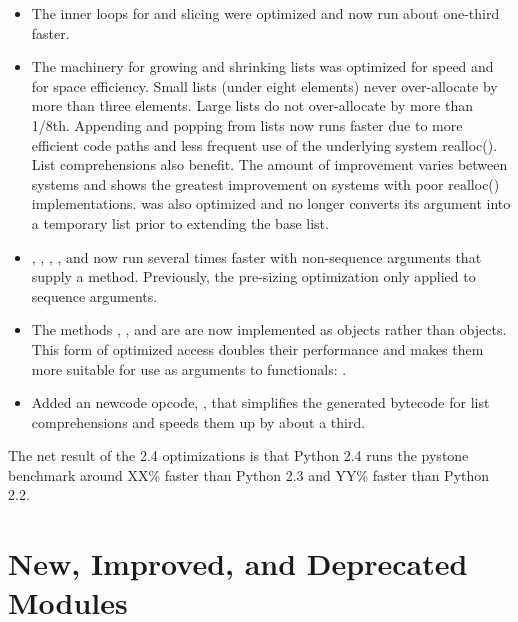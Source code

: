 \documentclass{howto}
\begin{document}
\begin{itemize}

\item The inner loops for  and  slicing
 were optimized and now run about one-third faster.                                 

\item The machinery for growing and shrinking lists was optimized
 for speed and for space efficiency.  Small lists (under eight elements)
 never over-allocate by more than three elements.  Large lists do not
 over-allocate by more than 1/8th.  Appending and popping from lists
 now runs faster due to more efficient code paths and less frequent
 use of the underlying system realloc().  List comprehensions also
 benefit.  The amount of improvement varies between systems and shows
 the greatest improvement on systems with poor realloc() implementations.
  was also optimized and no longer converts its
 argument into a temporary list prior to extending the base list.

\item {}, , ,
  , and  now run several times
  faster with non-sequence arguments that supply a 
  method.  Previously, the pre-sizing optimization only applied to
  sequence arguments.

\item The methods ,
  , and  are
  are now implemented as  objects rather
  than  objects.  This form of optimized
  access doubles their performance and makes them more suitable for
  use as arguments to functionals:
  .

\item Added an newcode opcode, , that simplifies
  the generated bytecode for list comprehensions and speeds them up
  by about a third.

\end{itemize}

The net result of the 2.4 optimizations is that Python 2.4 runs the
pystone benchmark around XX\% faster than Python 2.3 and YY\% faster
than Python 2.2.


\section{New, Improved, and Deprecated Modules}
\end{document}
